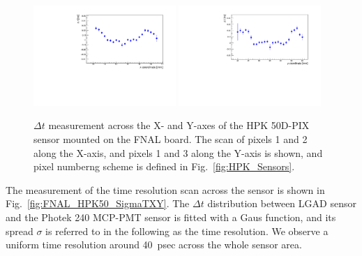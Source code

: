 \documentclass[preprint,1p]{elsarticle}
\begin{document}
\begin{figure}[htbp] 
\centering
\includegraphics[width=0.48\textwidth]{figs/FNALBoard_HPK50DPix_Run847-891/MeanTime_vs_X_Ch4_5.pdf} 
\includegraphics[width=0.48\textwidth]{figs/FNALBoard_HPK50DPix_Run847-891/MeanTime_vs_Y_Ch3_4.pdf} 
\caption{$\Delta t$ measurement across the X- and Y-axes of the HPK 50D-PIX sensor mounted on the FNAL board. The scan of pixels 1 and 2 along the X-axis, and pixels 1 and 3 along the Y-axis is shown, and pixel numberng scheme is defined in Fig.~\ref{fig:HPK_Sensors}.} 
\label{fig:FNAL_HPK50_DTXY} 
\end{figure} 

The measurement of the time resolution scan across the sensor is shown in
Fig.~\ref{fig:FNAL_HPK50_SigmaTXY}. The $\Delta t$ distribution between LGAD
sensor and the Photek 240 MCP-PMT sensor is fitted with a Gaus function, and its
spread $\sigma$ is referred to in the following as the time resolution. We
observe a uniform time resolution around 40~psec across the whole sensor area. 
\end{document}
